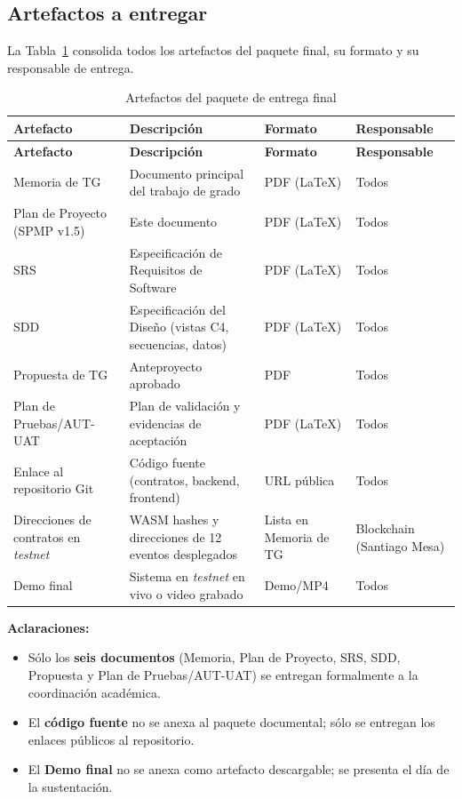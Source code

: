 \documentclass[12pt,oneside]{report}
\begin{document}
    \subsection{Artefactos a entregar}
    \label{subsec:artefactos-entrega}

      La Tabla~\ref{tab:artefactos-entrega} consolida todos los artefactos del paquete final, su formato y su responsable de entrega.

      \begin{longtable}{@{}p{4.5cm} p{4.0cm} p{3.0cm} p{3.0cm}@{}}
        \caption{Artefactos del paquete de entrega final}
        \label{tab:artefactos-entrega}\\
        \toprule
        \textbf{Artefacto} & \textbf{Descripción} & \textbf{Formato} & \textbf{Responsable}\\
        \midrule
        \endfirsthead
        \toprule
        \textbf{Artefacto} & \textbf{Descripción} & \textbf{Formato} & \textbf{Responsable}\\
        \midrule
        \endhead
        \bottomrule
        \endfoot
        Memoria de TG & Documento principal del trabajo de grado & PDF (\LaTeX) & Todos\\
        Plan de Proyecto (SPMP v1.5) & Este documento & PDF (\LaTeX) & Todos\\
        SRS & Especificación de Requisitos de Software & PDF (\LaTeX) & Todos\\
        SDD & Especificación del Diseño (vistas C4, secuencias, datos) & PDF (\LaTeX) & Todos\\
        Propuesta de TG & Anteproyecto aprobado & PDF & Todos\\
        Plan de Pruebas/AUT-UAT & Plan de validación y evidencias de aceptación & PDF (\LaTeX) & Todos\\
        Enlace al repositorio Git & Código fuente (contratos, backend, frontend) & URL pública & Todos\\
        Direcciones de contratos en \textit{testnet} & WASM hashes y direcciones de 12 eventos desplegados & Lista en Memoria de TG & Blockchain (Santiago Mesa)\\
        Demo final & Sistema en \textit{testnet} en vivo o video grabado & Demo/MP4 & Todos\\
      \end{longtable}

      \textbf{Aclaraciones:}
      \begin{itemize}
        \item Sólo los \textbf{seis documentos} (Memoria, Plan de Proyecto, SRS, SDD, Propuesta y Plan de Pruebas/AUT-UAT) se entregan formalmente a la coordinación académica.
        \item El \textbf{código fuente} no se anexa al paquete documental; sólo se entregan los enlaces públicos al repositorio.
        \item El \textbf{Demo final} no se anexa como artefacto descargable; se presenta el día de la sustentación.
      \end{itemize}
\end{document}

